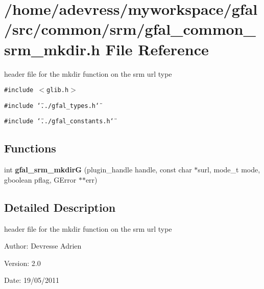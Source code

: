 \section{/home/adevress/myworkspace/gfal/src/common/srm/gfal\_\-common\_\-srm\_\-mkdir.h File Reference}
\label{gfal__common__srm__mkdir_8h}
header file for the mkdir function on the srm url type 

{\tt \#include $<$glib.h$>$}\par
{\tt \#include \char`\"{}../gfal\_\-types.h\char`\"{}}\par
{\tt \#include \char`\"{}../gfal\_\-constants.h\char`\"{}}\par
\subsection*{Functions}
\begin{CompactItemize}
\item 
int \textbf{gfal\_\-srm\_\-mkdir\-G} (plugin\_\-handle handle, const char $\ast$surl, mode\_\-t mode, gboolean pflag, GError $\ast$$\ast$err)\label{gfal__common__srm__mkdir_8h_e6f3e836543cf269a0838b3745efc9ed}

\end{CompactItemize}


\subsection{Detailed Description}
header file for the mkdir function on the srm url type 

\begin{Desc}
\item[Author:]Devresse Adrien \end{Desc}
\begin{Desc}
\item[Version:]2.0 \end{Desc}
\begin{Desc}
\item[Date:]19/05/2011 \end{Desc}
